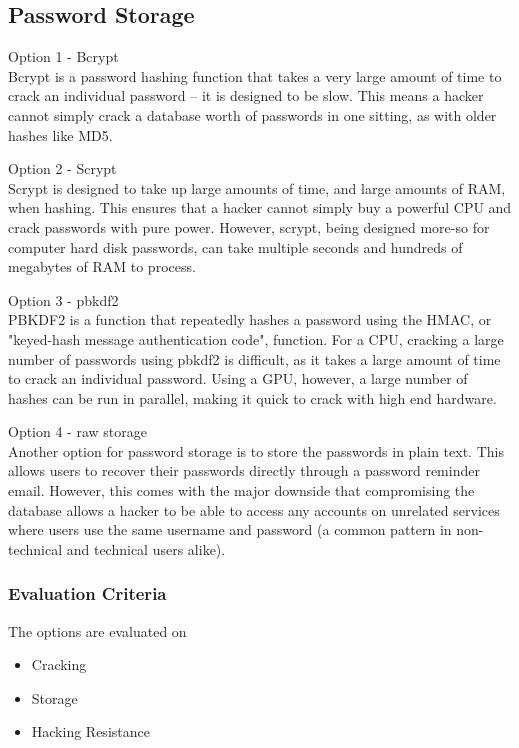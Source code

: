 \documentclass[onecolumn, draftclsnofoot,10pt, compsoc]{IEEEtran}
\begin{document}
{\newpage
\subsection{Password Storage}
\noindent Option 1 - Bcrypt \\
\noindent Bcrypt is a password hashing function that takes a very large amount of time to crack
an individual password -- it is designed to be slow. This means a hacker cannot simply crack
a database worth of passwords in one sitting, as with older hashes like MD5. 

\medskip

\noindent Option 2 - Scrypt \\
\noindent Scrypt is designed to take up large amounts of time, and large amounts of RAM,
when hashing. This ensures that a hacker cannot simply buy a powerful CPU and crack passwords with
pure power. However, scrypt, being designed more-so for computer hard disk passwords, can take
multiple seconds and hundreds of megabytes of RAM to process. 

\medskip

\noindent Option 3 - pbkdf2 \\
\noindent PBKDF2 is a function that repeatedly hashes a password using the HMAC, or "keyed-hash
message authentication code", function. For a CPU, cracking a large number of passwords using pbkdf2
is difficult, as it takes a large amount of time to crack an individual password. Using a GPU,
however, a large number of hashes can be run in parallel, making it quick to crack with high end hardware. 

\medskip

\noindent Option 4 - raw storage \\
\noindent Another option for password storage is to store the passwords in plain text. This allows
users to recover their passwords directly through a password reminder email. However, this comes with
the major downside that compromising the database allows a hacker to be able to access any
accounts on unrelated services where users use the same username and password (a common pattern
in non-technical and technical users alike). 

\medskip

\subsubsection{Evaluation Criteria} 
{\noindent The options are evaluated on

\begin{itemize}
\item Cracking
\item Storage
\item Hacking Resistance
\end{itemize}

}}
\end{document}
